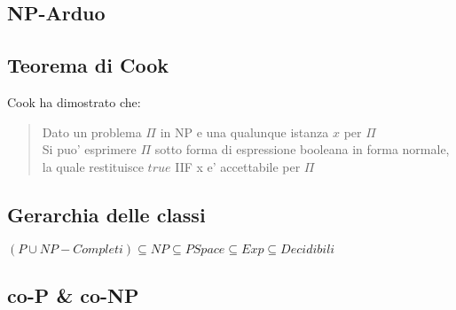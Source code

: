 \subsection{NP-Arduo}
\subsection{Teorema di Cook}
Cook ha dimostrato che:
\begin{quote}
    Dato un problema $\Pi$ in NP e una qualunque istanza $x$ per $\Pi$\\
    Si puo' esprimere $\Pi$ sotto forma di espressione booleana in forma normale, la quale restituisce $true$ IIF x e' accettabile per $\Pi$
\end{quote}
\subsection{Gerarchia delle classi}
\begin{center}
    $(P \cup NP-Completi) \subseteq NP \subseteq PSpace \subseteq Exp \subseteq Decidibili$
\end{center}
\subsection{co-P \& co-NP}

